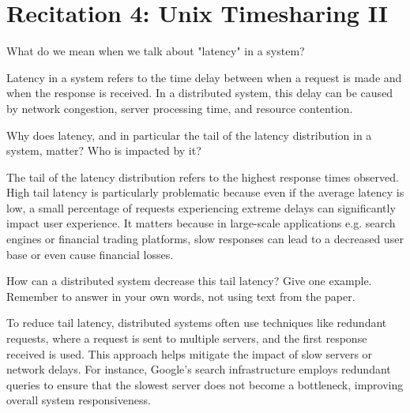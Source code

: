 \documentclass[a4paper]{article}
\begin{document}
\section*{Recitation 4: Unix Timesharing II}

\begin{Exercise}
    What do we mean when we talk about "latency" in a system?
\end{Exercise} 
\begin{Solution}
    Latency in a system refers to the time delay between when a request is made and when the response is received. In a distributed system, this delay can be caused by network congestion, server processing time, and resource contention.
\end{Solution}
\begin{Exercise}
    Why does latency, and in particular the tail of the latency distribution in a system, matter? Who is impacted by it?
\end{Exercise}
\begin{Solution}
    The tail of the latency distribution refers to the highest response times observed. High tail latency is particularly problematic because even if the average latency is low, a small percentage of requests experiencing extreme delays can significantly impact user experience. It matters because in large-scale applications e.g. search engines or financial trading platforms, slow responses can lead to a decreased user base or even cause financial losses. 
\end{Solution}
\begin{Exercise}
    How can a distributed system decrease this tail latency? Give one example. Remember to answer in your own words, not using text from the paper.
\end{Exercise}
\begin{Solution}
    To reduce tail latency, distributed systems often use techniques like redundant requests, where a request is sent to multiple servers, and the first response received is used. This approach helps mitigate the impact of slow servers or network delays. For instance, Google's search infrastructure employs redundant queries to ensure that the slowest server does not become a bottleneck, improving overall system responsiveness.
\end{Solution}
\end{document}
